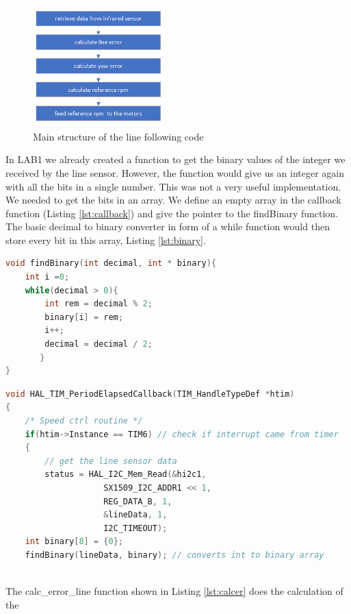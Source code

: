\documentclass[english]{article}
\begin{document}
\begin{figure}[!h]
    \centering
    \includegraphics[width=0.45\textwidth, height=0.25\textheight]{figures/procedure.png}
    \caption{Main structure of the line following code}
    \label{fig:pro}
\end{figure}
\newpage
In LAB1 we already created a function to get the binary values of the integer we
 received by the line sensor. However, the function would give us an integer again
  with all the bits in a single number. This was not a very useful implementation.
  We needed to get the bits in an array. We define an empty array in the callback
 function (Listing \ref{lst:callback}) and give the pointer to the findBinary function. The basic
 decimal to binary converter in form of a while function would then store every bit in
  this array, Listing \ref{lst:binary}.
\begin{lstlisting}[language=C, caption={converts integer to a binary array}, label={lst:binary} ]
void findBinary(int decimal, int * binary){
    int i =0;
    while(decimal > 0){
        int rem = decimal % 2;
        binary[i] = rem;
        i++;
        decimal = decimal / 2;
       }
}
\end{lstlisting}
\begin{lstlisting}[language=C, caption={Top part of the timer callback function }, label={lst:callback} ]
    void HAL_TIM_PeriodElapsedCallback(TIM_HandleTypeDef *htim)
{
	/* Speed ctrl routine */
	if(htim->Instance == TIM6) // check if interrupt came from timer
	{
		// get the line sensor data
		status = HAL_I2C_Mem_Read(&hi2c1,
                    SX1509_I2C_ADDR1 << 1,
                    REG_DATA_B, 1,
                    &lineData, 1,
                    I2C_TIMEOUT);
    int binary[8] = {0};
    findBinary(lineData, binary); // converts int to binary array
    
\end{lstlisting}
The calc\_error\_line function shown in Listing \ref{lst:calcer} does the calculation of the 
\end{document}
